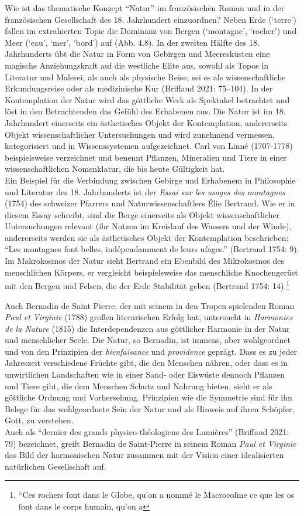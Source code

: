 \documentclass[
  12pt,
  letterpaper,
  DIV=11,
  numbers=noendperiod]{scrreprt}
\begin{document}
Wie ist das thematische Konzept ``Natur'' im französischen Roman und in
der französischen Gesellschaft des 18. Jahrhundert einzuordnen? Neben
Erde (`terre') fallen im extrahierten Topic die Dominanz von Bergen
(`montagne', `rocher') und Meer (`eau', `mer', `bord') auf (Abb. 4.8).
In der zweiten Hälfte des 18. Jahrhunderts übt die Natur in Form von
Gebirgen und Meeresküsten eine magische Anziehungskraft auf die
westliche Elite aus, sowohl als Topos in Literatur und Malerei, als auch
als physische Reise, sei es als wissenschaftliche Erkundungsreise oder
als medizinische Kur (Briffaud 2021: 75--104). In der Kontemplation der
Natur wird das göttliche Werk als Spektakel betrachtet und löst in den
Betrachtenden das Gefühl des Erhabenen aus. Die Natur ist im 18.
Jahrhundert einerseits ein ästhetisches Objekt der Kontemplation,
andererseits Objekt wissenschaftlicher Untersuchungen und wird zunehmend
vermessen, kategorisiert und in Wissenssystemen aufgezeichnet. Carl von
Linné (1707-1778) beispielsweise verzeichnet und benennt Pflanzen,
Mineralien und Tiere in einer wissenschaftlichen Nomenklatur, die bis
heute Gültigkeit hat.\\
Ein Beispiel für die Verbindung zwischen Gebirge und Erhabenem in
Philosophie und Literatur des 18. Jahrhunderts ist der \emph{Essai sur
les usages des montagnes} (1754) des schweizer Pfarrers und
Naturwissenschaftlers Élie Bertrand. Wie er in diesem Essay schreibt,
sind die Berge einerseits als Objekt wissenschaftlicher Untersuchungen
relevant (ihr Nutzen im Kreislauf des Wassers und der Winde),
andererseits werden sie als ästhetisches Objekt der Kontemplation
beschrieben: ``Les montagnes ſont belles, indépendamment de leurs
uſages.'' (Bertrand 1754: 9). Im Makrokosmos der Natur sieht Bertrand
ein Ebenbild des Mikrokosmos des menschlichen Körpers, er vergleicht
beispielsweise das menschliche Knochengerüst mit den Bergen und Felsen,
die der Erde Stabilität geben (Bertrand 1754: 14).\footnote{``Ces
  rochers ſont dans le Globe, qu'on a nommé le Macrocoſme ce que les os
  ſont dans le corps humain, qu'on a}

Auch Bernadin de Saint Pierre, der mit seinem in den Tropen spielenden
Roman \emph{Paul et Virginie} (1788) großen literarischen Erfolg hat,
untersucht in \emph{Harmonies de la Nature} (1815) die Interdependenzen
aus göttlicher Harmonie in der Natur und menschlicher Seele. Die Natur,
so Bernadin, ist immens, aber wohlgeordnet und von den Prinzipien der
\emph{bienfaisance} und \emph{providence} geprägt. Dass es zu jeder
Jahreszeit verschiedene Früchte gibt, die den Menschen nähren, oder dass
es in unwirtlichen Landschaften wie in einer Sand- oder Eiswüste dennoch
Pflanzen und Tiere gibt, die dem Menschen Schutz und Nahrung bieten,
sieht er als göttliche Ordnung und Vorhersehung. Prinzipien wie die
Symmetrie sind für ihn Belege für das wohlgeordnete Sein der Natur und
als Hinweis auf ihren Schöpfer, Gott, zu verstehen.\\
Auch als ``dernier des grands physico-théologiens des Lumières''
(Briffaud 2021: 79) bezeichnet, greift Bernadin de Saint-Pierre in
seinem Roman \emph{Paul et Virginie} das Bild der harmonischen Natur
zusammen mit der Vision einer idealisierten natürlichen Gesellschaft
auf.
\end{document}
